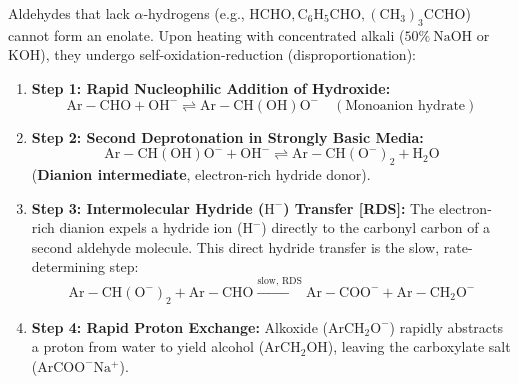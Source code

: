 \documentclass[10pt,twoside,openright]{book}
\begin{document}
\begin{conceptbox}
Aldehydes that lack $\alpha$-hydrogens (e.g., $\mathrm{HCHO, C_6H_5CHO, (CH_3)_3CCHO}$) cannot form an enolate. Upon heating with concentrated alkali ($50\% \ \mathrm{NaOH}$ or $\mathrm{KOH}$), they undergo self-oxidation-reduction (disproportionation):
\begin{enumerate}[leftmargin=*]
  \item \textbf{Step 1: Rapid Nucleophilic Addition of Hydroxide:}
  \begin{equation}
    \mathrm{Ar-CHO} + \mathrm{OH^-} \rightleftharpoons \mathrm{Ar-CH(OH)O^-} \quad (\text{Monoanion hydrate})
  \end{equation}
  \item \textbf{Step 2: Second Deprotonation in Strongly Basic Media:}
  \begin{equation}
    \mathrm{Ar-CH(OH)O^-} + \mathrm{OH^-} \rightleftharpoons \mathrm{Ar-CH(O^-)_2} + \mathrm{H_2O}
  \end{equation}
  (\textbf{Dianion intermediate}, electron-rich hydride donor).
  \item \textbf{Step 3: Intermolecular Hydride ($\mathrm{H^-}$) Transfer [RDS]:}
  The electron-rich dianion expels a hydride ion ($\mathrm{H^-}$) directly to the carbonyl carbon of a second aldehyde molecule. This direct hydride transfer is the slow, rate-determining step:
  \begin{equation}
    \mathrm{Ar-CH(O^-)_2} + \mathrm{Ar-CHO} \xrightarrow{\text{slow, RDS}} \mathrm{Ar-COO^-} + \mathrm{Ar-CH_2O^-}
  \end{equation}
  \item \textbf{Step 4: Rapid Proton Exchange:}
  Alkoxide ($\mathrm{ArCH_2O^-}$) rapidly abstracts a proton from water to yield alcohol ($\mathrm{ArCH_2OH}$), leaving the carboxylate salt ($\mathrm{ArCOO^-Na^+}$).
\end{enumerate}
\end{conceptbox}
\end{document}

